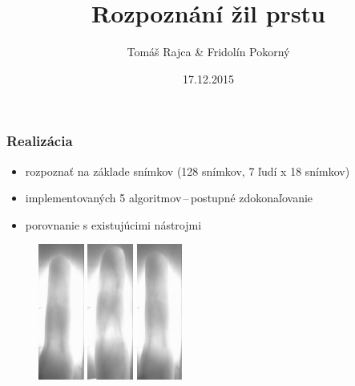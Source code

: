 \documentclass[compress]{beamer}
\begin{document}
\title{Rozpoznání žil prstu}
\author{Tomáš Rajca \& Fridolín Pokorný}
\date{17.12.2015}


\begin{frame}[plain]
  \titlepage
\end{frame}


\begin{frame}
  \frametitle{Realizácia}
  \begin{itemize}
    \item rozpoznať na základe snímkov (128 snímkov, 7 ľudí x 18 snímkov)
    \item implementovaných 5 algoritmov\,--\,postupné zdokonaľovanie
    \item porovnanie s existujúcimi nástrojmi
  \end{itemize}
\begin{figure}[ht!]
	\centering
	\includegraphics[width=1.5cm]{../fig/A_18.eps}
	\includegraphics[width=1.5cm]{../fig/A_10.eps}
	\includegraphics[width=1.5cm]{../fig/A_12.eps}
\end{figure}
\end{frame}
\end{document}

